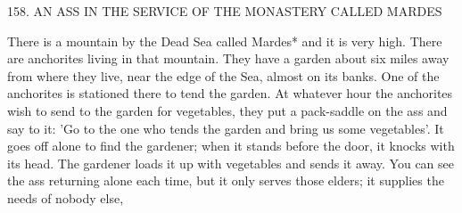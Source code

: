 158.
AN ASS IN THE SERVICE OF THE MONASTERY
CALLED MARDES

There is a mountain by the Dead Sea called Mardes* and it is very
high.
There are anchorites living in that mountain.
They have a
garden about six miles away from where they live, near the edge of
the Sea, almost on its banks.
One of the anchorites is stationed there
to tend the garden.
At whatever hour the anchorites wish to send to
the garden for vegetables, they put a pack-saddle on the ass and say
to it: 'Go to the one who tends the garden and bring us some
vegetables'.
It goes off alone to find the gardener; when it stands
before the door, it knocks with its head.
The gardener loads it up
with vegetables and sends it away.
You can see the ass returning
alone each time, but it only serves those elders; it supplies the needs
of nobody else,


